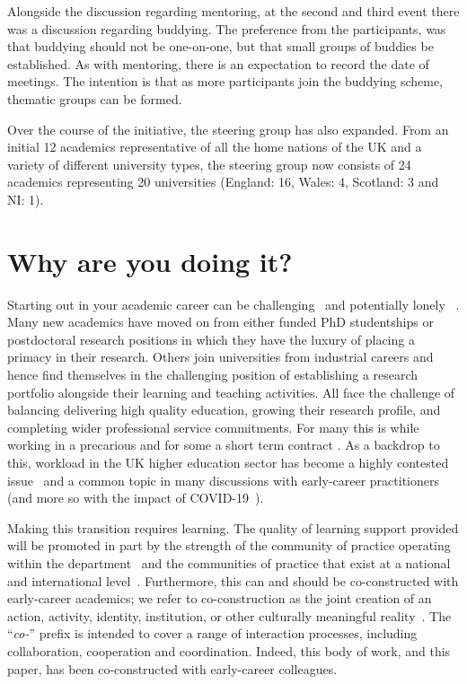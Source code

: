 \documentclass[sigconf]{acmart}
\begin{document}
Alongside the discussion regarding mentoring, at the second and third
event there was a discussion regarding buddying. The preference from
the participants, was that buddying should not be one-on-one, but that
small groups of buddies be established. As with mentoring, there is an
expectation to record the date of meetings. The intention is that as
more participants join the buddying scheme, thematic groups can be
formed.

Over the course of the initiative, the steering group has also
expanded. From an initial 12 academics representative of all the home
nations of the UK and a variety of different university types, the
steering group now consists of 24 academics representing 20
universities (England: 16, Wales: 4, Scotland: 3 and NI: 1).

\section{Why are you doing it?}
\label{sec:Why}
Starting out in your academic career can be
challenging~\cite{Thomas2015} and potentially lonely
~\cite{Foote2009}. Many new academics have moved on from either funded
PhD studentships or postdoctoral research positions in which they have
the luxury of placing a primacy in their research. Others join
universities from industrial careers and hence find themselves in the
challenging position of establishing a research portfolio alongside
their learning and teaching activities. All face the challenge of
balancing delivering high quality education, growing their research
profile, and completing wider professional service commitments. For
many this is while working in a precarious and for some a short term
contract \cite{UCU,JaffeS}. As a backdrop to this, workload in the UK
higher education sector has become a highly contested
issue~\cite{UCU2016} and a common topic in many discussions with
early-career practitioners (and more so with the impact of
COVID-19~\cite{crick-et-al:ukicer2020,watermeyer-et-al:he2020,CrickCovidUK}).

Making this transition requires learning. The quality of learning
support provided will be promoted in part by the strength of the
community of practice operating within the
department~\cite{Bolander2008} and the communities of practice that
exist at a national and international
level~\cite{Thomas2015}. Furthermore, this can and should be
co-constructed with early-career academics; we refer to
co-construction as the joint creation of an action, activity,
identity, institution, or other culturally meaningful
reality~\cite{jacoby+ochs:1995}. The ``{\emph{co-}}'' prefix is
intended to cover a range of interaction processes, including
collaboration, cooperation and coordination. Indeed, this body of
work, and this paper, has been co-constructed with early-career
colleagues.
\end{document}
